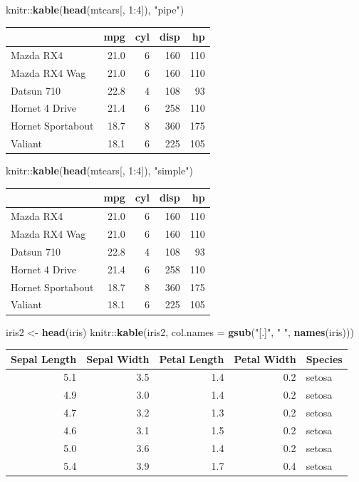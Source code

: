\documentclass[]{tufte-handout}
\newenvironment{Shaded}{}{}
\newcommand{\DataTypeTok}[1]{\textcolor[rgb]{0.56,0.13,0.00}{#1}}
\newcommand{\DecValTok}[1]{\textcolor[rgb]{0.25,0.63,0.44}{#1}}
\newcommand{\KeywordTok}[1]{\textcolor[rgb]{0.00,0.44,0.13}{\textbf{#1}}}
\newcommand{\NormalTok}[1]{#1}
\newcommand{\OperatorTok}[1]{\textcolor[rgb]{0.40,0.40,0.40}{#1}}
\newcommand{\StringTok}[1]{\textcolor[rgb]{0.25,0.44,0.63}{#1}}
\begin{document}
\begin{Shaded}
\begin{Highlighting}[]
\NormalTok{knitr}\OperatorTok{::}\KeywordTok{kable}\NormalTok{(}\KeywordTok{head}\NormalTok{(mtcars[, }\DecValTok{1}\OperatorTok{:}\DecValTok{4}\NormalTok{]), }\StringTok{"pipe"}\NormalTok{)}
\end{Highlighting}
\end{Shaded}

\begin{longtable}[]{@{}lrrrr@{}}
\toprule
& mpg & cyl & disp & hp\tabularnewline
\midrule
\endhead
Mazda RX4 & 21.0 & 6 & 160 & 110\tabularnewline
Mazda RX4 Wag & 21.0 & 6 & 160 & 110\tabularnewline
Datsun 710 & 22.8 & 4 & 108 & 93\tabularnewline
Hornet 4 Drive & 21.4 & 6 & 258 & 110\tabularnewline
Hornet Sportabout & 18.7 & 8 & 360 & 175\tabularnewline
Valiant & 18.1 & 6 & 225 & 105\tabularnewline
\bottomrule
\end{longtable}

\begin{Shaded}
\begin{Highlighting}[]
\NormalTok{knitr}\OperatorTok{::}\KeywordTok{kable}\NormalTok{(}\KeywordTok{head}\NormalTok{(mtcars[, }\DecValTok{1}\OperatorTok{:}\DecValTok{4}\NormalTok{]), }\StringTok{"simple"}\NormalTok{)}
\end{Highlighting}
\end{Shaded}

\begin{longtable}[]{@{}lrrrr@{}}
\toprule
& mpg & cyl & disp & hp\tabularnewline
\midrule
\endhead
Mazda RX4 & 21.0 & 6 & 160 & 110\tabularnewline
Mazda RX4 Wag & 21.0 & 6 & 160 & 110\tabularnewline
Datsun 710 & 22.8 & 4 & 108 & 93\tabularnewline
Hornet 4 Drive & 21.4 & 6 & 258 & 110\tabularnewline
Hornet Sportabout & 18.7 & 8 & 360 & 175\tabularnewline
Valiant & 18.1 & 6 & 225 & 105\tabularnewline
\bottomrule
\end{longtable}

\begin{Shaded}
\begin{Highlighting}[]
\NormalTok{iris2 <-}\StringTok{ }\KeywordTok{head}\NormalTok{(iris)}
\NormalTok{knitr}\OperatorTok{::}\KeywordTok{kable}\NormalTok{(iris2, }\DataTypeTok{col.names =} \KeywordTok{gsub}\NormalTok{(}\StringTok{"[.]"}\NormalTok{, }\StringTok{" "}\NormalTok{, }\KeywordTok{names}\NormalTok{(iris)))}
\end{Highlighting}
\end{Shaded}

\begin{longtable}[]{@{}rrrrl@{}}
\toprule
Sepal Length & Sepal Width & Petal Length & Petal Width &
Species\tabularnewline
\midrule
\endhead
5.1 & 3.5 & 1.4 & 0.2 & setosa\tabularnewline
4.9 & 3.0 & 1.4 & 0.2 & setosa\tabularnewline
4.7 & 3.2 & 1.3 & 0.2 & setosa\tabularnewline
4.6 & 3.1 & 1.5 & 0.2 & setosa\tabularnewline
5.0 & 3.6 & 1.4 & 0.2 & setosa\tabularnewline
5.4 & 3.9 & 1.7 & 0.4 & setosa\tabularnewline
\bottomrule
\end{longtable}
\end{document}
